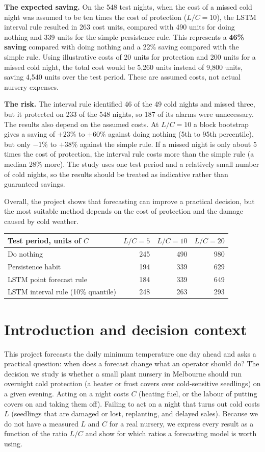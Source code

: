 \documentclass[11pt,a4paper]{article}
\newcommand{\SiteType}{a small plant nursery in Melbourne}
\begin{document}
\textbf{The expected saving.} On the 548 test nights, when the cost of a missed cold night was assumed to be ten times the cost of protection ($L/C=10$), the LSTM interval rule resulted in 263 cost units, compared with 490 units for doing nothing and 339 units for the simple persistence rule. This represents a \textbf{46\% saving} compared with doing nothing and a 22\% saving compared with the simple rule. Using illustrative costs of 20 units for protection and 200 units for a missed cold night, the total cost would be 5,260 units instead of 9,800 units, saving 4,540 units over the test period. These are assumed costs, not actual nursery expenses.

\textbf{The risk.} The interval rule identified 46 of the 49 cold nights and missed three, but it protected on 233 of the 548 nights, so 187 of its alarms were unnecessary. The results also depend on the assumed costs. At $L/C=10$ a block bootstrap gives a saving of $+23\%$ to $+60\%$ against doing nothing (5th to 95th percentile), but only $-1\%$ to $+38\%$ against the simple rule. If a missed night is only about 5 times the cost of protection, the interval rule costs more than the simple rule (a median 28\% more). The study uses one test period and a relatively small number of cold nights, so the results should be treated as indicative rather than guaranteed savings.

Overall, the project shows that forecasting can improve a practical decision, but the most suitable method depends on the cost of protection and the damage caused by cold weather.

\begin{center}
\begin{tabular}{lrrr}
\toprule
Test period, units of $C$ & $L/C=5$ & $L/C=10$ & $L/C=20$\\
\midrule
Do nothing & 245 & 490 & 980\\
Persistence habit & 194 & 339 & 629\\
LSTM point forecast rule & 184 & 339 & 649\\
LSTM interval rule (10\% quantile) & 248 & 263 & 293\\
\bottomrule
\end{tabular}
\end{center}
\normalsize
\newpage
\tableofcontents
\newpage
\section{Introduction and decision context}
This project forecasts the daily minimum temperature one day ahead and asks a practical question: when does a forecast change what an operator should do? The decision we study is whether \SiteType{} should run overnight cold protection (a heater or frost covers over cold-sensitive seedlings) on a given evening. Acting on a night costs $C$ (heating fuel, or the labour of putting covers on and taking them off). Failing to act on a night that turns out cold costs $L$ (seedlings that are damaged or lost, replanting, and delayed sales). Because we do not have a measured $L$ and $C$ for a real nursery, we express every result as a function of the ratio $L/C$ and show for which ratios a forecasting model is worth using.
\end{document}
